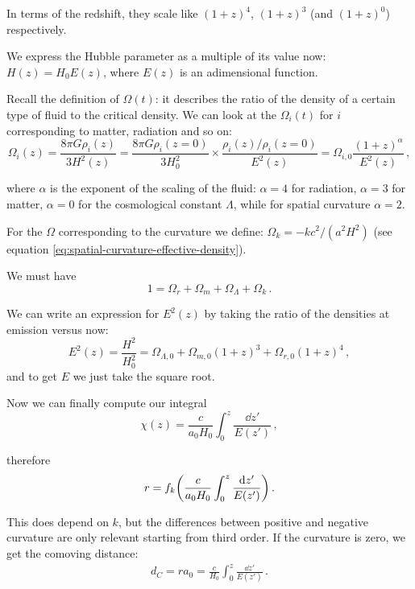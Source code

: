 \documentclass[main.tex]{subfiles}
\begin{document}
In terms of the redshift, they scale like \((1+z)^{4}\), \((1+z)^{3}\) (and \((1+z)^{0}\)) respectively.

We express the Hubble parameter as a multiple of its value now: \(H(z) = H_0 E(z)\), where \(E(z)\) is an adimensional function.

Recall the definition of \(\Omega (t)\): it describes the ratio of the density of a certain type of fluid to the critical density. We can look at the \(\Omega_i (t)\) for \(i\) corresponding to matter, radiation and so on: 
%
\begin{equation}
  \Omega _i (z) = \frac{8 \pi G \rho _i (z)}{3 H^2(z)}
  = \frac{8 \pi G \rho_{i}(z=0)}{3 H_0 ^2} \times  \frac{\rho _i (z) / \rho_{i}(z=0)}{E^2(z)}
  = \Omega _{i,0} \frac{(1+z)^{\alpha }}{E^2(z)}
\,,
\end{equation}

where \(\alpha \) is the exponent of the scaling of the fluid: \(\alpha = 4\) for radiation, \(\alpha = 3\) for matter, \(\alpha = 0\) for the cosmological constant \(\Lambda \), while for spatial curvature \(\alpha = 2\).

For the \(\Omega \) corresponding to the curvature we define: \(\Omega _k = - k c^2/(a^2 H^2)\) (see equation \eqref{eq:spatial-curvature-effective-density}).

We must have 
%
\begin{equation}
  1 = \Omega _r + \Omega _m + \Omega _\Lambda + \Omega _k
\,.
\end{equation}

We can write an expression for \(E^2(z)\) by taking the ratio of the densities at emission versus now:
%
\begin{equation}
  E^2(z) = \frac{H^2}{H_0^2} = 
  \Omega _{\Lambda , 0} +  \Omega_{m, 0} (1+z)^{3}
  +\Omega_{r, 0} (1+z)^4
\,,
\end{equation}
%
and to get \(E\) we just take the square root.

Now we can finally compute our integral 
%
\begin{equation}
  \chi (z) = \frac{c}{a_0 H_0 } \int_{0}^{z} \frac{\dd{z'} }{E(z')}
\,,
\end{equation}
%

therefore 
%
\begin{equation}
  r = f_k \qty(\frac{c}{a_0 H_0 } \int_0^z \frac{\dd{z'}   }{E(z')})
\,.
\end{equation}
%

This does depend on \(k\), but the differences between positive and negative curvature are only relevant starting from third order.
If the curvature is zero, we get the comoving distance:
%
\begin{align}
d_C = r a_0 = \frac{c}{H_0 } \int_{0}^{z} \frac{ \dd{z'}}{E(z')}
\,.
\end{align}
\end{document}
